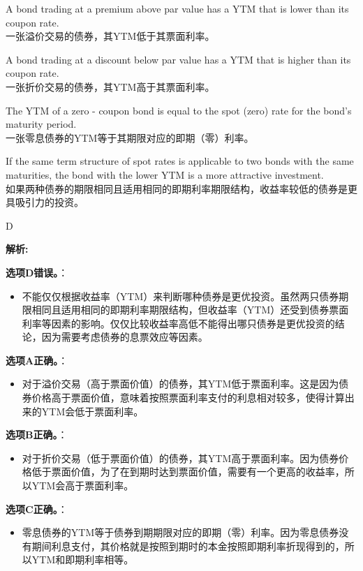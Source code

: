 \documentclass{article}
\newenvironment{explanation}
{\textbf{解析:}\par}
{\par}
\begin{document}
\begin{choices}
    \item A bond trading at a premium above par value has a YTM that is lower than its coupon rate.\\
    一张溢价交易的债券，其YTM低于其票面利率。
    \item A bond trading at a discount below par value has a YTM that is higher than its coupon rate.\\
    一张折价交易的债券，其YTM高于其票面利率。
    \item The YTM of a zero - coupon bond is equal to the spot (zero) rate for the bond's maturity period.\\
    一张零息债券的YTM等于其期限对应的即期（零）利率。
    \item If the same term structure of spot rates is applicable to two bonds with the same maturities, the bond with the lower YTM is a more attractive investment.\\
    如果两种债券的期限相同且适用相同的即期利率期限结构，收益率较低的债券是更具吸引力的投资。
\end{choices}

\begin{correctanswer}
    D
\end{correctanswer}

\begin{explanation}
\textbf{选项D错误。}：
\begin{itemize}
\item 不能仅仅根据收益率（YTM）来判断哪种债券是更优投资。虽然两只债券期限相同且适用相同的即期利率期限结构，但收益率（YTM）还受到债券票面利率等因素的影响。仅仅比较收益率高低不能得出哪只债券是更优投资的结论，因为需要考虑债券的息票效应等因素。
\end{itemize}
\textbf{选项A正确。}：
\begin{itemize}
\item 对于溢价交易（高于票面价值）的债券，其YTM低于票面利率。这是因为债券价格高于票面价值，意味着按照票面利率支付的利息相对较多，使得计算出来的YTM会低于票面利率。
    \end{itemize}
    \textbf{选项B正确。}：
    \begin{itemize}
    \item 对于折价交易（低于票面价值）的债券，其YTM高于票面利率。因为债券价格低于票面价值，为了在到期时达到票面价值，需要有一个更高的收益率，所以YTM会高于票面利率。
    \end{itemize}
    \textbf{选项C正确。}：
    \begin{itemize}
    \item 零息债券的YTM等于债券到期期限对应的即期（零）利率。因为零息债券没有期间利息支付，其价格就是按照到期时的本金按照即期利率折现得到的，所以YTM和即期利率相等。
    \end{itemize}
    \end{explanation}
    
\end{document}
